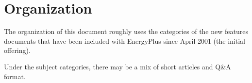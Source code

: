 \section{Organization}\label{organization}

The organization of this document roughly uses the categories of the new features documents that have been included with EnergyPlus since April 2001 (the initial offering).

Under the subject categories, there may be a mix of short articles and Q\&A format.
